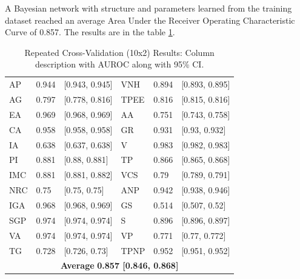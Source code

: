 
A Bayesian network with structure and parameters learned from the training dataset reached an average Area Under the Receiver Operating Characteristic Curve of 0.857. The results are in the table \ref{tab:result_auc}.

\begin{table}[htpb]
 \caption{Repeated Cross-Validation (10x2) Results: Column description with AUROC along with 95\% CI.} \label{tab:result_auc} 

\renewcommand{\arraystretch}{1.2}
\centering
\begin{tabular} { p{1.5cm} p{1.5cm} p{3cm} p{1.5cm} p{1.5cm} l }
\hline
AP & 0.944 & [0.943, 0.945] & VNH & 0.894 & [0.893, 0.895] \\
AG & 0.797 & [0.778, 0.816] & TPEE & 0.816 & [0.815, 0.816] \\
EA & 0.969 & [0.968, 0.969] & AA & 0.751 & [0.743, 0.758] \\
CA & 0.958 & [0.958, 0.958] & GR & 0.931 & [0.93, 0.932] \\
IA & 0.638 & [0.637, 0.638] & V & 0.983 & [0.982, 0.983] \\
PI & 0.881 & [0.88, 0.881] & TP & 0.866 & [0.865, 0.868] \\
IMC & 0.881 & [0.881, 0.882] & VCS & 0.79 & [0.789, 0.791] \\
NRC & 0.75 & [0.75, 0.75] & ANP & 0.942 & [0.938, 0.946] \\
IGA & 0.968 & [0.968, 0.969] & GS & 0.514 & [0.507, 0.52] \\
SGP & 0.974 & [0.974, 0.974] & S & 0.896 & [0.896, 0.897] \\
VA & 0.974 & [0.974, 0.974] & VP & 0.771 & [0.77, 0.772] \\
TG & 0.728 & [0.726, 0.73] & TPNP & 0.952 & [0.951, 0.952] \\
\hline
 \multicolumn{6}{c}{\textbf{Average}  \textbf{0.857 [0.846, 0.868]}} \\

\hline
\end{tabular}
\end{table}


